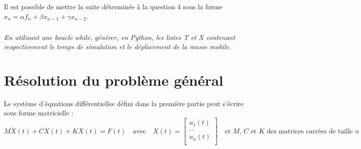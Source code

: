 \documentclass[10pt]{article}
\newif\ifprof
\begin{document}
\ifprof
\begin{corrige}
\begin{py}
\begin{python}
def f_omega(Tsimu,h,fmax,fsign):
   """
   Entrées :
       * Tsimu (flt) : temps de la simulation en seconde
       * h (flt) : pas de temps de a simulation
       * fmax (flt) : amplitude du signal (en Newton)
       * fsign (flt) : fréquence du signal (en Hertz)
   Sortie : 
       * F (list) : liste des valeurs de la fonction 
          f_n (t)= fmax sin (omega *t)
   """
    omega  = 2*math.pi*fsign
    t=0 
    F = []
    while t<Tsimu :
        F.append(fmax*math.sin(omega*t))
        t=t+h
    return F
    
\end{python}
\end{py}

\end{corrige}
\else
\fi

\ifprof
\else

Il est possible de mettre la suite déterminée à la question 4 sous la forme $x_n = \alpha f_n +\beta x_{n-1} + \gamma x_{n-2}$.

\fi

\subparagraph{}
\textit{En utilisant une boucle \textsf{while}, générer, en Python, les listes \textsf{T} et \textsf{X} contenant respectivement le temps de simulation et le déplacement de la masse mobile.}
\ifprof
\begin{corrige}
\begin{python}

T=[0,h]
X=[0,0]
t=2*h
i=2
while t<Tsimu:
    T.append(t)
    X.append(alpha*F[i]+beta*X[i-1] +gamma*X(i-2))
    i=i+1
    t = t+h
\end{python}
\end{corrige}
\else
\fi


\section{Résolution du problème général}

\ifprof
\else

Le système d'équations différentielles défini dans la première partie peut s'écrire sous forme matricielle :
$$
M \ddot{X}(t) +C \dot{X}(t) +K {X}(t) = F(t) \quad \text{avec} \quad 
X(t)=\left[
\begin{array}{c} 
u_1(t) \\ 
... \\ 
u_n(t) \\
\end{array}\right] \quad \text{et $M$, $C$ et $K$ des matrices carrées de taille $n\times n$.}
$$
\end{document}
